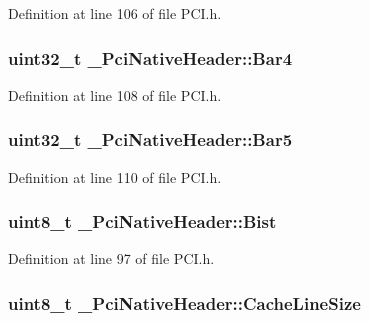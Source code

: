 Definition at line 106 of file P\+C\+I.\+h.

\subsubsection[{\texorpdfstring{Bar4}{Bar4}}]{\setlength{\rightskip}{0pt plus 5cm}uint32\+\_\+t \+\_\+\+Pci\+Native\+Header\+::\+Bar4}\hypertarget{struct__PciNativeHeader_a1fdd80a61e6b295ebbe6ba26483c9e2a}{}\label{struct__PciNativeHeader_a1fdd80a61e6b295ebbe6ba26483c9e2a}


Definition at line 108 of file P\+C\+I.\+h.

\subsubsection[{\texorpdfstring{Bar5}{Bar5}}]{\setlength{\rightskip}{0pt plus 5cm}uint32\+\_\+t \+\_\+\+Pci\+Native\+Header\+::\+Bar5}\hypertarget{struct__PciNativeHeader_aa18626af4b1e61cb290c6c8fb2e8a895}{}\label{struct__PciNativeHeader_aa18626af4b1e61cb290c6c8fb2e8a895}


Definition at line 110 of file P\+C\+I.\+h.

\subsubsection[{\texorpdfstring{Bist}{Bist}}]{\setlength{\rightskip}{0pt plus 5cm}uint8\+\_\+t \+\_\+\+Pci\+Native\+Header\+::\+Bist}\hypertarget{struct__PciNativeHeader_a57e75ff47ecc5d366d176a20e4023931}{}\label{struct__PciNativeHeader_a57e75ff47ecc5d366d176a20e4023931}


Definition at line 97 of file P\+C\+I.\+h.

\subsubsection[{\texorpdfstring{Cache\+Line\+Size}{CacheLineSize}}]{\setlength{\rightskip}{0pt plus 5cm}uint8\+\_\+t \+\_\+\+Pci\+Native\+Header\+::\+Cache\+Line\+Size}\hypertarget{struct__PciNativeHeader_a2a524801b4961a6ef1ed8df9fd658621}{}\label{struct__PciNativeHeader_a2a524801b4961a6ef1ed8df9fd658621}


